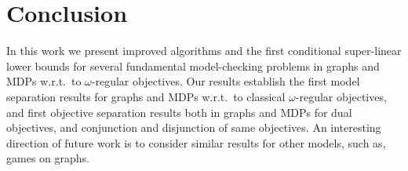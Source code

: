 \documentclass[11pt,letterpaper]{article}
\begin{document}
\section{Conclusion}\label{sec:conclusion}
In this work we present improved algorithms and the first conditional
super-linear lower bounds for several fundamental model-checking 
problems in graphs and MDPs w.r.t.\ to $\omega$-regular objectives. 
Our results establish the first model separation results for graphs
and MDPs w.r.t.\ to classical $\omega$-regular objectives, and first 
objective separation results both in graphs and MDPs for dual objectives,
and conjunction and disjunction of same objectives.
An interesting direction of future work is to consider similar results
for other models, such as, games on graphs.
\end{document}
